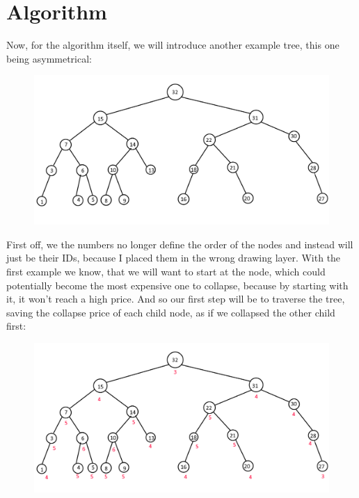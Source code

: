 \documentclass{../../../ksp}
\begin{document}
\section*{Algorithm}

Now, for the algorithm itself, we will introduce another example tree, this one being asymmetrical:

\begin{figure}[H]
    \centering
    \includegraphics[width=\textwidth]{./asym example base.png}
\end{figure}

First off, we the numbers no longer define the order of the nodes and instead will just be their IDs, because I placed them in the wrong drawing layer.
With the first example we know, that we will want to start at the node, which could potentially become the most expensive one to collapse, because by starting with it, it won't reach a high price.
And so our first step will be to traverse the tree, saving the collapse price of each child node, as if we collapsed the other child first:

\begin{figure}[H]
    \centering
    \includegraphics[width=\textwidth]{./asym example step 1.png}
\end{figure}
\end{document}
